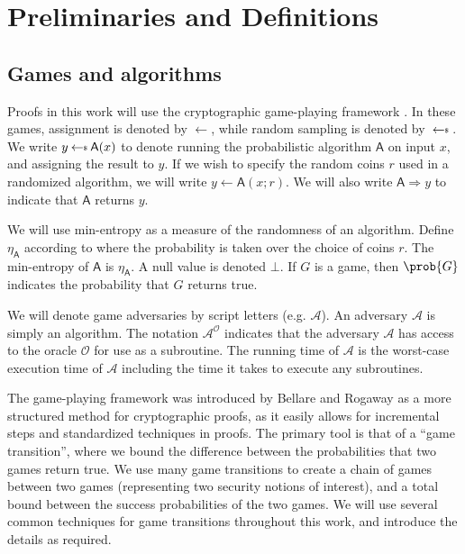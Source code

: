 \chapter{Preliminaries and Definitions} \label{sec:preliminaries}

\section{Games and algorithms}
Proofs in this work will use the cryptographic game-playing framework \cite{EC:BelRog06}. In these games, assignment is denoted by $\leftarrow$, while random sampling is denoted by $\sample$. We write $y \sample \mathsf{A}(x)$ to denote running the probabilistic algorithm $\mathsf{A}$ on input $x$, and assigning the result to $y$. If we wish to specify the random coins $r$ used in a randomized algorithm, we will write $y \leftarrow \mathsf{A}(x;r)$. We will also write $\mathsf{A} \Rightarrow y$ to indicate that $\mathsf{A}$ returns $y$.

We will use min-entropy as a measure of the randomness of an algorithm. Define $\eta_\mathsf{A}$ according to
where the probability is taken over the choice of coins $r$. The min-entropy of $\mathsf{A}$ is $\eta_\mathsf{A}$. A null value is denoted $\bot$. If $G$ is a game, then $\prob{G}$ indicates the probability that $G$ returns true. 

We will denote game adversaries by script letters (e.g. $\mathcal{A}$). An adversary $\mathcal{A}$ is simply an algorithm. The notation $\mathcal{A}^{\mathcal{O}}$ indicates that the adversary $\mathcal{A}$ has access to the oracle $\mathcal{O}$ for use as a subroutine. The running time of $\mathcal{A}$ is the worst-case execution time of $\mathcal{A}$ including the time it takes to execute any subroutines.

The game-playing framework was introduced by Bellare and Rogaway \cite{EC:BelRog06} as a more structured method for cryptographic proofs, as it easily allows for incremental steps and standardized techniques in proofs. The primary tool is that of a ``game transition'', where we bound the difference between the probabilities that two games return true. We use many game transitions to create a chain of games between two games (representing two security notions of interest), and a total bound between the success probabilities of the two games. We will use several common techniques for game transitions throughout this work, and introduce the details as required.


